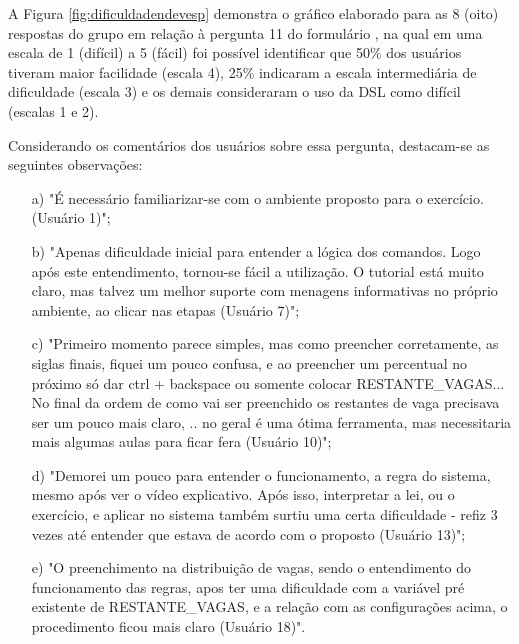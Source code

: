 A Figura \ref{fig:dificuldadendevesp} demonstra o gráfico elaborado para as 8 (oito) respostas do grupo em relação à pergunta 11 do formulário , na qual em uma escala de 1 (difícil) a 5 (fácil) foi possível identificar que 50\% dos usuários tiveram maior facilidade (escala 4), 25\% indicaram a escala intermediária de dificuldade (escala 3) e os demais consideraram o uso da DSL como difícil (escalas 1 e 2). 



Considerando os comentários dos usuários sobre essa pergunta, destacam-se as seguintes observações:

\begin{enumerate}
    \item [a)] "É necessário familiarizar-se com o ambiente proposto para o exercício.  (Usuário 1)";
    
    \item [b)] "Apenas dificuldade inicial para entender a lógica dos comandos. Logo após este entendimento, tornou-se fácil a utilização. O tutorial está muito claro, mas talvez um melhor suporte com menagens informativas no próprio ambiente, ao clicar nas etapas (Usuário 7)";
    
    \item [c)] "Primeiro momento parece simples, mas como preencher corretamente, as siglas finais, fiquei um pouco confusa, e ao preencher um percentual no próximo só dar ctrl + backspace ou somente colocar RESTANTE\_VAGAS... No final da ordem de como vai ser preenchido os restantes de vaga precisava ser um pouco mais claro, .. no geral é uma ótima ferramenta, mas necessitaria mais algumas aulas para ficar fera (Usuário 10)";
    
    \item [d)] "Demorei um pouco para entender o funcionamento, a regra do sistema, mesmo após ver o vídeo explicativo. Após isso, interpretar a lei, ou o exercício, e aplicar no sistema também surtiu uma certa dificuldade - refiz 3 vezes até entender que estava de acordo com o proposto (Usuário 13)";
    
    \item[e)] "O preenchimento na distribuição de vagas, sendo o entendimento do funcionamento das regras, apos ter uma dificuldade com a variável pré existente de RESTANTE\_VAGAS, e a relação com as configurações acima, o procedimento ficou mais claro (Usuário 18)".
\end{enumerate}

